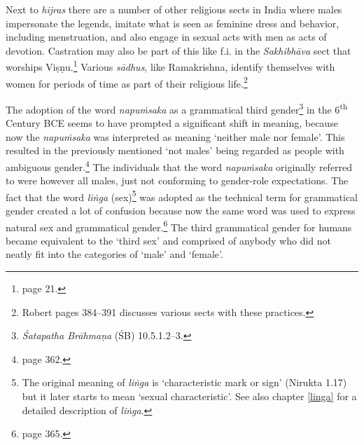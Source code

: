 Next to {\em hijras} there are a number of other religious sects in India where males impersonate the legends, imitate what is seen as feminine dress and behavior, including menstruation, and also engage in sexual acts with men as acts of devotion. Castration may also be part of this like f.i. in the {\em Sakhibhāva} sect that worships Viṣṇu.\footnote{\cite{nanda} page 21.} Various {\em sādhus}, like Ramakrishna, identify themselves with women for periods of time as part of their religious life.\footnote{Robert \cite{goldman} pages 384–391 discusses various sects with these practices.} 

The adoption of the word {\em napuṁsaka} as a grammatical third gender\footnote{{\em Śatapatha Brāhmaṇa} (ŚB) 10.5.1.2–3.} in the 6\textsuperscript{th} Century BCE seems to have prompted a significant shift in meaning, because now the {\em napuṁsaka} was interpreted as meaning `neither male nor female'. This resulted in the previously mentioned `not males' being regarded as people with ambiguous gender.\footnote{\cite{zwilling2000} page 362.} The individuals that the word {\em napuṁsaka} originally referred to were however all males, just not conforming to gender-role expectations. The fact that the word {\em liṅga} (sex)\footnote{The original meaning of {\em liṅga} is `characteristic mark or sign' (Nirukta 1.17) but it later starts to mean `sexual characteristic'. See also chapter \ref{linga} for a detailed description of {\em liṅga}.} was adopted as the technical term for grammatical gender created a lot of confusion because now the same word was used to express natural sex and grammatical gender.\footnote{\cite{zwilling} page 365.} The third grammatical gender for humans became equivalent to the `third sex' and comprised of anybody who did not neatly fit into the categories of `male' and `female'.


